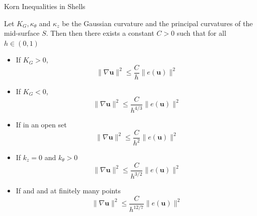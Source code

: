 \documentclass{beamer}
\newcommand{\bul}{{\color{structure}\textbullet}}
\begin{document}
\begin{frame}{Korn Inequalities in Shells}
    \begin{theorem}
        Let $K_{G},\kappa_{\theta}$ and $\kappa_{z}$ be the Gaussian curvature and the principal curvatures of the mid-surface $S$. Then then there exists a constant $C>0$ such that for all $h \in(0,1)$
        \begin{itemize}
            \item[\bul] If {$K_{G}>0$}, 
            \vspace{-0.2cm}
            {$$\|\nabla \boldsymbol{u}\|^{2} \leq \frac{C}{h}\|e(\boldsymbol{u})\|^{2}$$}
            \vspace{-0.8cm}
            \item[\bul] If {$K_{G}<0$},
            { $$
            \|\nabla \boldsymbol{u}\|^{2} \leq \frac{C}{h^{4 / 3}}\|e(\boldsymbol{u})\|^{2}$$}
            \vspace{-0.8cm}
            \item[\bul] If  in an open set
            \vspace{-0.4cm}
            {\color{violet} $$
            \|\nabla \boldsymbol{u}\|^{2} \leq \frac{C}{h^2}\|e(\boldsymbol{u})\|^{2}$$}
            \vspace{-0.8cm}
            \item[\bul] If $k_z=0$ and $k_\theta>0$
            \vspace{-0.4cm}
            {
            $$
            \|\nabla \boldsymbol{u}\|^{2} \leq \frac{C}{h^{3/2}}\|e(\boldsymbol{u})\|^{2}$$}
            \vspace{-0.8cm}
            \item[\bul] If  and  and  at finitely many points
            \vspace{-0.4cm}
            {\color{violet} 
            $$
            \|\nabla \boldsymbol{u}\|^{2} \leq \frac{C}{h^{12/7}}\|e(\boldsymbol{u})\|^{2}$$}
        \end{itemize}
    \end{theorem}   
\end{frame}
\end{document}
